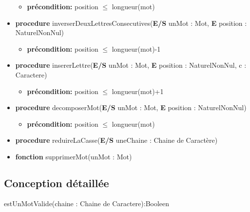 \begin{itemize}[label=$\ $, leftmargin=1cm]
\begin{itemize}[label=$| $]
            \item \textbf{précondition:} position $\leq$ longueur(mot)
         \end{itemize}
         \item \textbf{procedure} inverserDeuxLettresConsecutives(\textbf{E/S} unMot : Mot, \textbf{E} position : NaturelNonNul)
         \begin{itemize}[label=$| $]
            \item \textbf{précondition:} position $\leq$ longueur(mot)-1
         \end{itemize}
         \item \textbf{procedure} insererLettre(\textbf{E/S} unMot : Mot, \textbf{E} position : NaturelNonNul, c : Caractere)
         \begin{itemize}[label=$| $]
            \item \textbf{précondition:} position $\leq$ longueur(mot)+1
         \end{itemize}
         \item \textbf{procedure} decomposerMot(\textbf{E/S} unMot : Mot, \textbf{E} position : NaturelNonNul)
         \begin{itemize}[label=$| $]
            \item \textbf{précondition:} position $\leq$ longueur(mot)
         \end{itemize}
         \item \textbf{procedure} reduireLaCasse(\textbf{E/S} uneChaine : Chaine de Caractère)
         \item \textbf{fonction} supprimerMot(unMot : Mot)
	\end{itemize} 

    \subsection*{Conception détaillée}

    \begin{function}
        \SetAlgoLined
        \caption{estUnMotValide(chaine : Chaine de Caractere):Booleen}
    \end{function}
        

